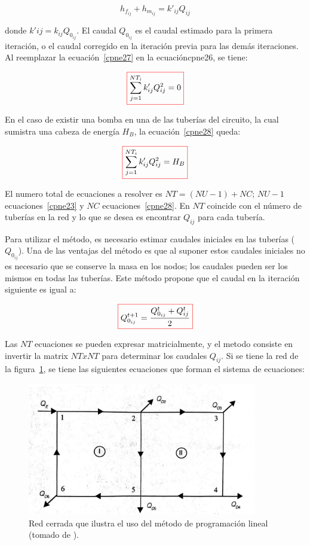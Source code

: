 \documentclass[11pt, oneside]{article}
\begin{document}
\begin{equation}
h_{f_{ij}}+h_{m_{ij}}= k'_{ij}Q_{ij}
\label{cpne27}
\end{equation}

donde $k'{ij} = k_{ij}Q_{0_{ij}}$. El caudal $Q_{0_{ij}}$ es el caudal estimado para la primera iteraci\'on, o el caudal corregido en la iteraci\'on previa para las dem\'as iteraciones. Al reemplazar la ecuaci\'on~\ref{cpne27} en la ecuaci\'on{cpne26}, se tiene:

\begin{equation}
\color{red}\boxed{\color{black} \sum_{j=1}^{NT_i} k'_{ij}Q_{ij}^2 = 0}
\label{cpne28}
\end{equation}

En el caso de existir una bomba en una de las tuber\'ias del circuito, la cual sumistra una cabeza de energ\'ia $H_B$, la ecuaci\'on~\ref{cpne28} queda:

\begin{equation}
\color{red}\boxed{\color{black} \sum_{j=1}^{NT_i} k'_{ij}Q_{ij}^2 = H_B }
\label{cpne29}
\end{equation}

El numero total de ecuaciones a resolver es $NT=(NU-1) + NC$; $NU-1$ ecuaciones~\ref{cpne23} y $NC$ ecuaciones~\ref{cpne28}. En $NT$ coincide con el n\'umero de tuber\'ias en la red y lo que se desea es encontrar $Q_{ij}$ para cada tuber\'ia. 

Para utilizar el m\'etodo, es necesario estimar caudales iniciales en las tuber\'ias ($Q_{0_{ij}}$). Una de las ventajas del m\'etodo es que al suponer estos caudales iniciales no es necesario que se conserve la masa en los nodos; los caudales pueden ser los mismos en todas las tuber\'ias. Este m\'etodo propone que el caudal en la iteraci\'on siguiente es igual a:

\begin{equation}
\color{red}\boxed{\color{black} Q_{0_{ij}}^{t+1} = \frac{Q_{0_{ij}}^{t} + Q_{ij}^t}{2} }
\label{cpne30}
\end{equation}

Las $NT$ ecuaciones se pueden expresar matricialmente, y el metodo consiste en invertir la matrix $NT x NT$ para determinar los caudales $Q_{ij}$. Si se tiene la red de la figura~\ref{cpnf}, se tiene las siguientes ecuaciones que forman el sistema de ecuaciones:

\begin{figure}[h]
\centering
\includegraphics[width=10cm]{./figs/cpnf.jpeg}
\caption{Red cerrada que ilustra el uso del m\'etodo de programaci\'on lineal (tomado de \cite{saldarriaga}).} 
\label{cpnf}
\end{figure}
\end{document}
